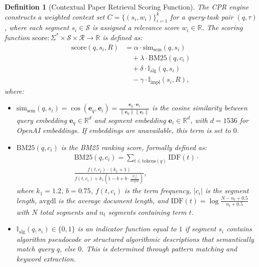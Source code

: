 \documentclass{ieeeaccess}
\newtheorem{definition}{Definition}
\begin{document}
\begin{definition}[Contextual Paper Retrieval Scoring Function]
\label{def:cpr-score}
The CPR engine constructs a weighted context set \(C = \{(s_i, w_i)\}_{i=1}^{k}\) for a query-task pair \((q, \tau)\), where each segment \(s_i \in \mathcal{S}\) is assigned a relevance score \(w_i \in \mathbb{R}\). The scoring function \(\text{score}: \Sigma^* \times \mathcal{S} \times \mathcal{R} \to \mathbb{R}\) is defined as:
\begin{equation}
\label{eq:cpr-score}
\begin{split}
\text{score}(q, s_i, R) &= \alpha \cdot \text{sim}_{\text{sem}}(q, s_i) \\
&\quad + \lambda \cdot \text{BM25}(q, c_i) \\
&\quad + \delta \cdot \mathbb{I}_{\text{alg}}(q, s_i) \\
&\quad - \gamma \cdot \mathbb{I}_{\text{impl}}(s_i, R),
\end{split}
\end{equation}
where:
\begin{itemize}
\item \(\text{sim}_{\text{sem}}(q, s_i) = \cos(\mathbf{e}_q, \mathbf{e}_i) = \frac{\mathbf{e}_q \cdot \mathbf{e}_i}{\|\mathbf{e}_q\| \|\mathbf{e}_i\|}\) is the cosine similarity between query embedding \(\mathbf{e}_q \in \mathbb{R}^d\) and segment embedding \(\mathbf{e}_i \in \mathbb{R}^d\), with \(d=1536\) for OpenAI embeddings. If embeddings are unavailable, this term is set to \(0\).
\item \(\text{BM25}(q, c_i)\) is the BM25 ranking score, formally defined as:
\begin{equation}
\begin{split}
  \text{BM25}(q, c_i) = \sum_{t \in \text{tokens}(q)} \text{IDF}(t) \cdot \\
  \frac{f(t, c_i) \cdot (k_1 + 1)}{f(t, c_i) + k_1 \left(1 - b + b \cdot \frac{|c_i|}{\text{avgdl}}\right)},
\end{split}
\end{equation}
  where \(k_1 = 1.2\), \(b = 0.75\), \(f(t, c_i)\) is the term frequency, \(|c_i|\) is the segment length, \(\text{avgdl}\) is the average document length, and \(\text{IDF}(t) = \log \frac{N - n_t + 0.5}{n_t + 0.5}\) with \(N\) total segments and \(n_t\) segments containing term \(t\).
\item \(\mathbb{I}_{\text{alg}}(q, s_i) \in \{0, 1\}\) is an indicator function equal to \(1\) if segment \(s_i\) contains algorithm pseudocode or structured algorithmic descriptions that semantically match query \(q\), else \(0\). This is determined through pattern matching and keyword extraction.

\end{itemize}
\end{definition}
\end{document}
